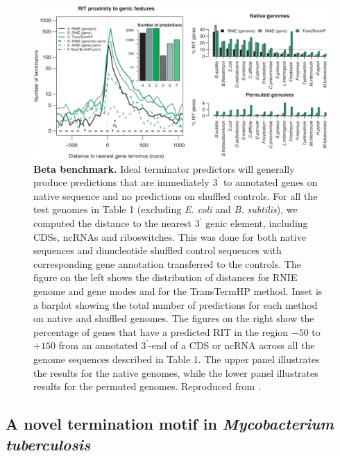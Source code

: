 \begin{figure}[htp]
\begin{center}
\includegraphics[width=14cm]{beta.jpg}
\caption[Beta benchmark]{\textbf{Beta benchmark.} Ideal terminator predictors will generally produce predictions that are immediately $3^\prime$ to annotated genes on native sequence and no predictions on shuffled controls. For all the test genomes in Table 1 (excluding {\it E. coli} and {\it B. subtilis}), we computed the distance to the nearest $3^\prime$ genic element, including CDSs, ncRNAs and riboswitches. This was done for both native sequences and dinucleotide shuffled control sequences with corresponding gene annotation transferred to the controls. The figure on the left shows the distribution of distances for RNIE genome and gene modes and for the TransTermHP method. Inset is a barplot showing the total number of predictions for each method on native and shuffled genomes. The figures on the right show the percentage of genes that have a predicted RIT in the region $-50$ to $+150$ from an annotated $3^\prime$-end of a CDS or ncRNA across all the genome sequences described in Table 1. The upper panel illustrates the results for the native genomes, while the lower panel illustrates results for the permuted genomes. Reproduced from \textcite{Gardner2011a}.
} 
\label{fig:beta}
\end{center}
\end{figure}

\subsection{A novel termination motif in \textit{Mycobacterium tuberculosis}}

